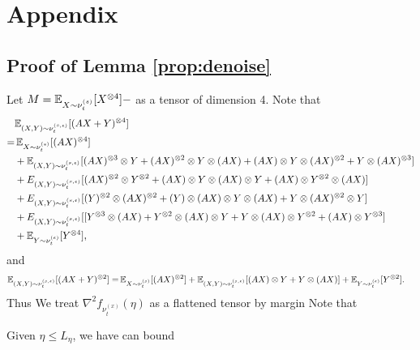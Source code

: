 \onecolumn

\section{Appendix}
\label{sec:Appendix}

\subsection{Proof of Lemma \ref{prop:denoise}}
Let $M = \mathbb{E}_{X\sim \nu_t^{(s)}}[X^{\otimes 4}] - $ as a tensor of dimension 4. 
Note that 
\begin{align*}
& \mathbb{E}_{(X,Y)\sim \nu_t^{(s,\epsilon)}} [(AX+Y)^{\otimes 4}]\\
 = & \,\mathbb{E}_{X\sim \nu_t^{(s)}}[(AX)^{\otimes 4}] \\
& + \mathbb{E}_{(X,Y)\sim \nu_t^{(s,\epsilon)}} [(AX)^{\otimes 3}\otimes Y + (AX)^{\otimes 2}\otimes Y\otimes (AX) + (AX)\otimes Y\otimes (AX)^{\otimes 2} + Y\otimes (AX)^{\otimes 3}] \\
& + E_{(X,Y)\sim \nu_t^{(s,\epsilon)}} [ (AX)^{\otimes 2}\otimes Y^{\otimes 2} + (AX)\otimes Y\otimes (AX)\otimes Y + (AX)\otimes Y^{\otimes 2}\otimes (AX)]\\
& +  E_{(X,Y)\sim \nu_t^{(s,\epsilon)}} [ (Y)^{\otimes 2}\otimes (AX)^{\otimes 2} + (Y)\otimes (AX)\otimes Y\otimes (AX) + Y\otimes (AX)^{\otimes 2}\otimes Y] \\
& + E_{(X,Y)\sim \nu_t^{(s,\epsilon)}} [[Y^{\otimes 3}\otimes (AX) + Y^{\otimes 2}\otimes (AX)\otimes Y + Y\otimes (AX)\otimes Y^{\otimes 2} + (AX)\otimes Y^{\otimes 3}] \\
& + \mathbb{E}_{Y\sim \nu_t^{(\epsilon)}}[Y^{\otimes 4}],
\end{align*}
and 
\begin{align*}
\mathbb{E}_{(X,Y)\sim \nu_t^{(s,\epsilon)}} [(AX+Y)^{\otimes 2}]= & \, \mathbb{E}_{X\sim \nu_t^{(s)}}[(AX)^{\otimes 2}] + \mathbb{E}_{(X,Y)\sim \nu_t^{(s,\epsilon)}}[(AX)\otimes Y + Y\otimes (AX)] + \mathbb{E}_{Y\sim \nu_t^{(\epsilon)}}[Y^{\otimes 2}].
\end{align*}
Thus 
We treat $\nabla^2f_{\nu_t^{(x)}}(\eta)$ as a flattened tensor by margin
Note that 

Given $\eta \le L_{\eta}$, we have can bound 

